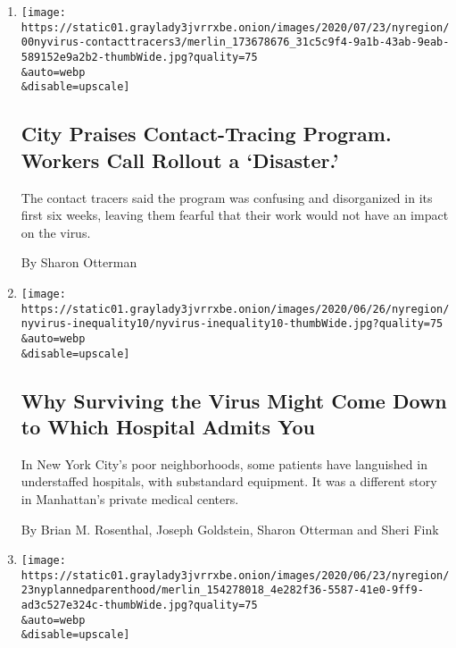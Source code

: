 \begin{enumerate}
\def\labelenumi{\arabic{enumi}.}
\item
  \href{/2020/07/29/nyregion/new-york-contact-tracing.html}{}

  \texttt{[image: https://static01.graylady3jvrrxbe.onion/images/2020/07/23/nyregion/00nyvirus-contacttracers3/merlin\_173678676\_31c5c9f4-9a1b-43ab-9eab-589152e9a2b2-thumbWide.jpg?quality=75\\\&auto=webp\\\&disable=upscale]}

  \hypertarget{city-praises-contact-tracing-program-workers-call-rollout-a-disaster}{%
  \subsection{City Praises Contact-Tracing Program. Workers Call Rollout
  a
  `Disaster.'}\label{city-praises-contact-tracing-program-workers-call-rollout-a-disaster}}

  The contact tracers said the program was confusing and disorganized in
  its first six weeks, leaving them fearful that their work would not
  have an impact on the virus.

  By Sharon Otterman
\item
  \href{/2020/07/01/nyregion/Coronavirus-hospitals.html}{}

  \texttt{[image: https://static01.graylady3jvrrxbe.onion/images/2020/06/26/nyregion/nyvirus-inequality10/nyvirus-inequality10-thumbWide.jpg?quality=75\\\&auto=webp\\\&disable=upscale]}

  \hypertarget{why-surviving-the-virus-might-come-down-to-which-hospital-admits-you}{%
  \subsection{Why Surviving the Virus Might Come Down to Which Hospital
  Admits
  You}\label{why-surviving-the-virus-might-come-down-to-which-hospital-admits-you}}

  In New York City's poor neighborhoods, some patients have languished
  in understaffed hospitals, with substandard equipment. It was a
  different story in Manhattan's private medical centers.

  By Brian M. Rosenthal, Joseph Goldstein, Sharon Otterman and Sheri
  Fink
\item
  \href{/2020/06/23/nyregion/ny-planned-parenthood-laura-mcquade.html}{}

  \texttt{[image: https://static01.graylady3jvrrxbe.onion/images/2020/06/23/nyregion/23nyplannedparenthood/merlin\_154278018\_4e282f36-5587-41e0-9ff9-ad3c527e324c-thumbWide.jpg?quality=75\\\&auto=webp\\\&disable=upscale]}


\end{enumerate}
